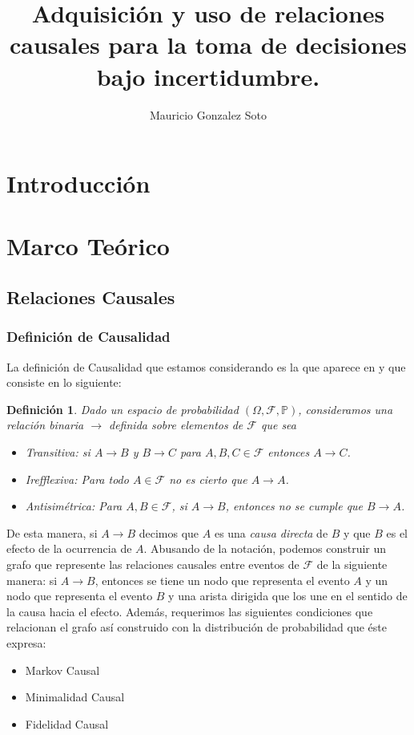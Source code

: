 \documentclass[11pt]{article}
\title{Adquisición y uso de relaciones causales para la toma de decisiones bajo incertidumbre.}
\author{Mauricio Gonzalez Soto}
\theoremstyle{plain}
\newtheorem{defi}[teo]{Definición}
\begin{document}
\maketitle
\section{Introducción}

\section{Marco Teórico}
	\subsection{Relaciones Causales}
		\subsubsection{Definición de Causalidad}
		La definición de Causalidad que estamos considerando es la que aparece en \cite{spirtes2000causation} y que consiste en lo siguiente:
		\begin{defi}
		Dado un espacio de probabilidad $(\Omega, \mathcal{F},\mathbb{P})$, consideramos una relación binaria $\to$ definida sobre elementos de $\mathcal{F}$ que sea
		\begin{itemize}
		\item Transitiva: si $A \to B$ y $B \to C$ para $A,B,C \in \mathcal{F}$ entonces $A \to C$.
		\item Irefflexiva: Para todo $A \in \mathcal{F}$ no es cierto que $A \to A$.
		\item Antisimétrica: Para $A, B \in \mathcal{F}$, si $A \to B$, entonces no se cumple que $B \to A$.
		\end{itemize}
		\end{defi}
		De esta manera, si $A \to B$ decimos que $A$ es una \textit{causa directa} de $B$ y que $B$ es el efecto de la ocurrencia de $A$. Abusando de la notación, podemos construir un grafo que 	         represente las relaciones  causales entre eventos de $\mathcal{F}$ de la siguiente manera: si $A \to B$, entonces se tiene un nodo que representa el evento $A$ y un nodo que representa el evento $B$ y una arista dirigida que los une en el sentido de la causa hacia el efecto. Además, requerimos las siguientes condiciones que relacionan el grafo así construido con la distribución de probabilidad que éste expresa:
		\begin{itemize}
		\item Markov Causal
		\item Minimalidad Causal
		\item Fidelidad Causal
		\end{itemize}
\end{document}
